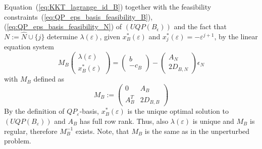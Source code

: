 \documentclass[a4paper]{article}
\begin{document}
Equation~(\ref{eq:KKT_lagrange_id_B}) together with the
feasibility constraints~(\ref{eq:QP_eps_basis_feasibility_B}),
(\ref{eq:QP_eps_basis_feasibility_N}) of
$(UQP(B_{\epsilon}))$ and the fact that $N:=\hat{N} \cup \{j\}$ determine
$\lambda(\varepsilon)$, given $x_{B}^{*}(\varepsilon)$ and
$x_{j}^{*}(\varepsilon) = -\varepsilon^{j+1}$, by the linear equation system
\begin{equation}
M_{B}\left(
        \begin{array}{c}
          \lambda(\varepsilon)  \\
          \hline
           x_{B}^{*}(\varepsilon)
        \end{array}
     \right)   
=
\left(
    \begin{array}{c}
        b \\
	\hline
	-c_{B}
     \end{array}
\right)
-
\left(
    \begin{array}{c}
        A_{N}  \\
	\hline
	2D_{B,N}
     \end{array}
\right)\epsilon_{N}
\end{equation}
with $M_{B}$ defined as
\begin{equation}
\label{def:M_B}
M_{B}:=\left(
           \begin{array}{c|c}
	       0 & A_{B} \\
	       \hline
	       A_{B}^{T} & 2D_{B,B}
	   \end{array}
	\right)
\end{equation}
By the definition of $QP_{\varepsilon}$-basis, $x_{B}^{*}(\varepsilon)$
is the unique optimal
solution to $(UQP(B_{\varepsilon}))$ and $A_{B}$ has full row rank. Thus, also
$\lambda(\varepsilon)$ is unique and $M_{B}$ is regular,
therefore $M_{B}^{-1}$ exists. Note,
that $M_{B}$ is the same as in the unperturbed problem.
 
\end{document}
